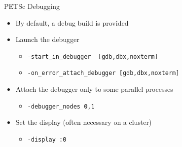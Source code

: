 
\begin{frame}[fragile]{PETSc Debugging}
  \begin{itemize}
  \item By default, a debug build is provided

  \vspace*{0.3cm}
  \item Launch the debugger
  \begin{itemize}
    \item \lstinline|-start_in_debugger  [gdb,dbx,noxterm]|
    \item \lstinline|-on_error_attach_debugger [gdb,dbx,noxterm]|
  \end{itemize}

  \vspace*{0.3cm}
  \item Attach the debugger only to some parallel processes
  \begin{itemize}
    \item \lstinline|-debugger_nodes 0,1|
  \end{itemize}

  \vspace*{0.3cm}
  \item Set the display (often necessary on a cluster)
  \begin{itemize}
    \item \lstinline|-display :0|
  \end{itemize}
\end{itemize}
\end{frame}  

